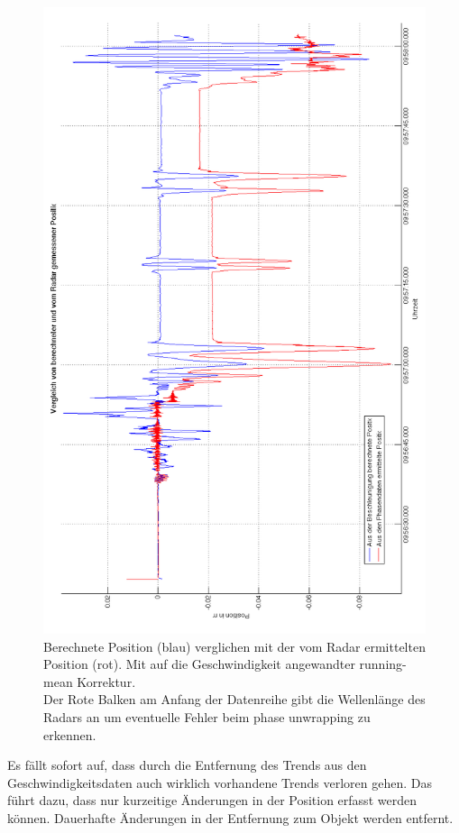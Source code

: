 \documentclass[12pt,a4paper,twoside,BCOR=12.5mm]{scrartcl}
\begin{document}
\begin{figure}[htb]
\centering
\includegraphics[scale=.4]{geoauswertung/best.png}
\caption{Berechnete Position (blau) verglichen mit der vom Radar ermittelten Position (rot). Mit auf die Geschwindigkeit angewandter running-mean Korrektur.\\Der Rote Balken am Anfang der Datenreihe gibt die Wellenlänge des Radars an um eventuelle Fehler beim phase unwrapping zu erkennen.}
\label{best}
\end{figure}



Es fällt sofort auf, dass durch die Entfernung des Trends aus den Geschwindigkeitsdaten auch wirklich vorhandene Trends verloren gehen. Das führt dazu, dass nur kurzeitige Änderungen in der Position erfasst werden können. Dauerhafte Änderungen in der Entfernung zum Objekt werden entfernt.
\end{document}
